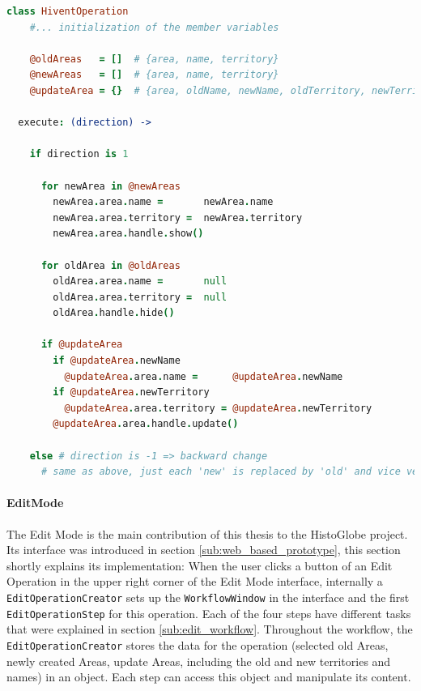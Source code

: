 \begin{center}
\begin{minipage}[t]{0.8\textwidth}
\begin{lstlisting}[language=coffeescript,
  caption=Execution of an \texttt{HiventOperation},
  label=lst:hivent_operation]
class HiventOperation
    #... initialization of the member variables

    @oldAreas   = []  # {area, name, territory}
    @newAreas   = []  # {area, name, territory}
    @updateArea = {}  # {area, oldName, newName, oldTerritory, newTerritory}

  execute: (direction) ->

    if direction is 1

      for newArea in @newAreas
        newArea.area.name =       newArea.name
        newArea.area.territory =  newArea.territory
        newArea.area.handle.show()

      for oldArea in @oldAreas
        oldArea.area.name =       null
        oldArea.area.territory =  null
        oldArea.handle.hide()

      if @updateArea
        if @updateArea.newName
          @updateArea.area.name =      @updateArea.newName
        if @updateArea.newTerritory
          @updateArea.area.territory = @updateArea.newTerritory
        @updateArea.area.handle.update()

    else # direction is -1 => backward change
      # same as above, just each 'new' is replaced by 'old' and vice versa
\end{lstlisting}
\end{minipage}
\end{center}


\paragraph{EditMode} %
\label{par:editmode}

The Edit Mode is the main contribution of this thesis to the HistoGlobe project. Its interface was introduced in section \ref{sub:web_based_prototype}, this section shortly explains its implementation: When the user clicks a button of an Edit Operation in the upper right corner of the Edit Mode interface, internally a \texttt{EditOperationCreator} sets up the \texttt{WorkflowWindow} in the interface and the first \texttt{EditOperationStep} for this operation. Each of the four steps have different tasks that were explained in section \ref{sub:edit_workflow}. Throughout the workflow, the \texttt{EditOperationCreator} stores the data for the operation (selected old Areas, newly created Areas, update Areas, including the old and new territories and names) in an object. Each step can access this object and manipulate its content.

